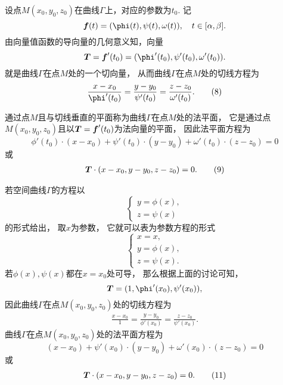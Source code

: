 设点\(M(x_0,y_0,z_0)\)在曲线\(\Gamma\)上，对应的参数为\(t_0\).
记\[
	\vb{f}(t)
	= (\phi(t),\psi(t),\omega(t)),
	\quad t\in[\alpha,\beta].
\]
由向量值函数的导向量的几何意义知，向量
\begin{equation}
	\vb{T}
	= \vb{f}'(t_0)
	= (\phi'(t_0),\psi'(t_0),\omega'(t_0)).
\end{equation}
就是曲线\(\Gamma\)在点\(M\)处的一个切向量，
从而曲线\(\Gamma\)在点\(M\)处的切线方程为
\begin{gather}
	\frac{x-x_0}{\phi'(t_0)}
	=\frac{y-y_0}{\psi'(t_0)}
	=\frac{z-z_0}{\omega'(t_0)}.
	\tag8
\end{gather}

通过点\(M\)且与切线垂直的平面称为曲线\(\Gamma\)在点\(M\)处的法平面，
它是通过点\(M(x_0,y_0,z_0)\)且以\(\boldsymbol{T}=\boldsymbol{f}'(t_0)\)为法向量的平面，
因此法平面方程为\[
	\phi'(t_0) \cdot (x-x_0) + \psi'(t_0) \cdot (y-y_0) + \omega'(t_0) \cdot (z-z_0) = 0
\]
或\begin{gather}
	\vb{T}\cdot(x-x_0,y-y_0,z-z_0)=0.
	\tag9
\end{gather}

若空间曲线\(\Gamma\)的方程以\[
	\left\{ \begin{array}{l}
		y = \phi(x), \\
		z = \psi(x)
	\end{array} \right.
\]的形式给出，
取\(x\)为参数，
它就可以表为参数方程的形式\[
	\left\{ \begin{array}{l}
		x = x, \\
		y = \phi(x), \\
		z = \psi(x).
	\end{array} \right.
\]
若\(\phi(x),\psi(x)\)都在\(x=x_0\)处可导，
那么根据上面的讨论可知，\[
	\vb{T} = (1,\phi'(x_0),\psi'(x_0)),
\]
因此曲线\(\Gamma\)在点\(M(x_0,y_0,z_0)\)处的切线方程为
\begin{gather}
	\frac{x-x_0}{1}
	=\frac{y-y_0}{\phi'(x_0)}
	=\frac{z-z_0}{\psi'(x_0)}.
	\tag{10}
\end{gather}
曲线\(\Gamma\)在点\(M(x_0,y_0,z_0)\)处的法平面方程为\[
	(x-x_0) + \psi'(x_0) \cdot (y-y_0) + \omega'(x_0) \cdot (z-z_0) = 0
\]或\begin{gather}
	\boldsymbol{T}\cdot(x-x_0,y-y_0,z-z_0)=0.
	\tag{11}
\end{gather}

